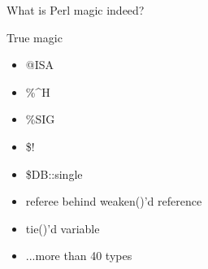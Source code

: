 \documentclass[mathserif,hyperref={urlcolor=cyan,colorlinks=true}]{beamer}
\begin{document}
\begin{frame}{What is Perl magic indeed?}
\begin{figure}
\end{figure}
\end{frame}

\begin{frame}{True magic}
\begin{itemize}
\item @ISA
\item \%\^{}H
\item \%SIG
\item \$!
\item \$DB::single
\item referee behind weaken()'d reference
\item tie()'d variable
\item ...more than 40 types
\end{itemize}
\end{frame}
\end{document}
